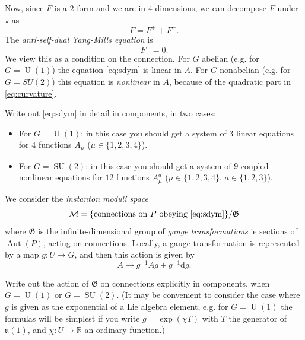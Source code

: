 \documentclass[12pt,letterpaper,reqno]{article}
\numberwithin{equation}{section}
\newcommand{\fG}{{\mathfrak G}}
\newcommand{\cM}{\ensuremath{\mathcal M}}
\newcommand{\R}{\ensuremath{\mathbb R}}
\newcommand{\de}{\mathrm{d}}
\newcommand{\ti}[1]{\textit{#1}}
\DeclareMathOperator{\Aut}{Aut}
\DeclareMathOperator{\SU}{SU}
\DeclareMathOperator{\U}{U}
\begin{document}
Now, since $F$ is a $2$-form and we are in $4$ dimensions,
we can decompose $F$ under $\star$ as
\begin{equation}
  F = F^+ + F^-.
\end{equation}
The \ti{anti-self-dual Yang-Mills equation} is
\begin{equation} \label{eq:sdym}
  F^+ = 0.
\end{equation}
We view this as a condition on the connection.
For $G$ abelian (e.g. for $G = \U(1)$) the equation \eqref{eq:sdym} is linear in $A$.
For $G$ nonabelian (e.g. for $G = SU(2)$) this
equation is \ti{nonlinear} in $A$, because of the quadratic part in \eqref{eq:curvature}.

\begin{exercise} Write out \eqref{eq:sdym} in detail in components, in two cases:
\begin{itemize}
  \item For $G = \U(1)$: in this case you should get a system of $3$ linear equations for $4$ functions $A_\mu$
  ($\mu \in \{1,2,3,4\}$).
  \item For $G = \SU(2)$: in this case you should get a system of $9$ coupled nonlinear equations for
  $12$ functions $A^a_\mu$ ($\mu \in \{1,2,3,4\}$, $a \in \{1,2,3\}$).
\end{itemize}
\end{exercise}

We consider the \ti{instanton moduli space}
\begin{equation}
  \cM = \{ \text{connections on $P$ obeying \eqref{eq:sdym}} \} / \fG
\end{equation}
where $\fG$ is the infinite-dimensional group of \ti{gauge transformations} ie
sections of $\Aut(P)$, acting on connections. Locally, a gauge transformation
is represented by a map $g: U \to G$, and then
this action is given by
\begin{equation}
  A \to g^{-1} A g + g^{-1} \de g.
\end{equation}

\begin{exercise}
Write out the action of $\fG$ on connections
explicitly in components, when $G = \U(1)$ or $G = \SU(2)$.
(It may be convenient to consider the case where $g$ is given as
the exponential of a Lie algebra element, e.g. for $G = \U(1)$
the formulas will be simplest if you write $g = \exp(\chi T)$ with $T$
the generator of ${\mathfrak u}(1)$, and $\chi: U \to \R$ an ordinary function.)
\end{exercise}
\end{document}
